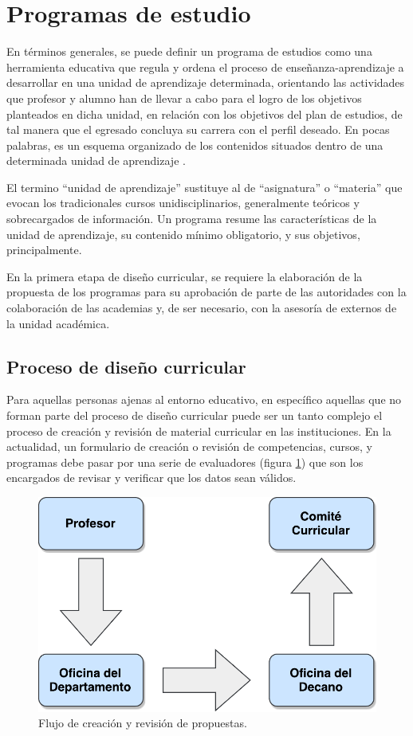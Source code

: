 \section{Programas de estudio}
En términos generales, se puede definir un programa de estudios como una herramienta educativa que regula y ordena el proceso de enseñanza-aprendizaje a desarrollar en una unidad de aprendizaje determinada, orientando las actividades que profesor y alumno han de llevar a cabo para el logro de los objetivos planteados en dicha unidad, en relación con los objetivos del plan de estudios, de tal manera que el egresado concluya su carrera con el perfil deseado. En pocas palabras, es un esquema organizado de los contenidos situados dentro de una determinada unidad de aprendizaje \citep{lalor_ensuring_2017}.

El termino \enquote{unidad de aprendizaje} sustituye al de \enquote{asignatura} o \enquote{materia} que evocan los tradicionales cursos unidisciplinarios, generalmente teóricos y sobrecargados de información. Un programa resume las características de la unidad de aprendizaje, su contenido mínimo obligatorio, y sus objetivos, principalmente.

En la primera etapa de diseño curricular, se requiere la elaboración de la propuesta de los programas para su aprobación de parte de las autoridades con la colaboración de las academias y, de ser necesario, con la asesoría de externos de la unidad académica.

\subsection{Proceso de diseño curricular} \label{procesoCurricular}
Para aquellas personas ajenas al entorno educativo, en específico aquellas que no forman parte del proceso de diseño curricular puede ser un tanto complejo el proceso de creación y revisión de material curricular en las instituciones. En la actualidad, un formulario de creación o revisión de competencias, cursos, y programas debe pasar por una serie de evaluadores (figura \ref{flujo_autoridades}) que son los encargados de revisar y verificar que los datos sean válidos.
\begin{figure}[H]
\centering
\includegraphics[scale=0.5]{Capitulos/MarcoTeorico/Imagenes/flujo_autoridades}
\caption{Flujo de creación y revisión de propuestas.}
  \label{flujo_autoridades}
\end{figure}

